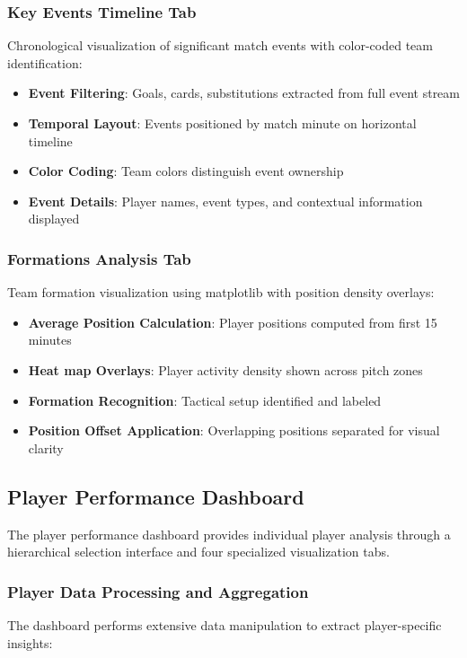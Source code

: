 \documentclass[12pt,a4paper]{article}
\begin{document}
\subsubsection{Key Events Timeline Tab}
Chronological visualization of significant match events with color-coded team identification:
\begin{itemize}
    \item \textbf{Event Filtering}: Goals, cards, substitutions extracted from full event stream
    \item \textbf{Temporal Layout}: Events positioned by match minute on horizontal timeline
    \item \textbf{Color Coding}: Team colors distinguish event ownership
    \item \textbf{Event Details}: Player names, event types, and contextual information displayed
\end{itemize}

\subsubsection{Formations Analysis Tab}
Team formation visualization using matplotlib with position density overlays:
\begin{itemize}
    \item \textbf{Average Position Calculation}: Player positions computed from first 15 minutes
    \item \textbf{Heat map Overlays}: Player activity density shown across pitch zones
    \item \textbf{Formation Recognition}: Tactical setup identified and labeled
    \item \textbf{Position Offset Application}: Overlapping positions separated for visual clarity
\end{itemize}


\subsection{Player Performance Dashboard}

The player performance dashboard provides individual player analysis through a hierarchical selection interface and four specialized visualization tabs.


\subsubsection{Player Data Processing and Aggregation}
The dashboard performs extensive data manipulation to extract player-specific insights:
\end{document}
